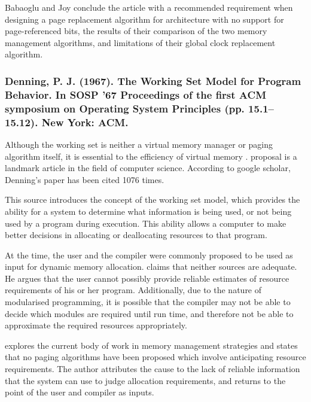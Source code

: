 Babaoglu and Joy conclude the article with a recommended requirement when designing a page replacement algorithm for architecture with no support for page-referenced bits, the results of their comparison of the two memory management algorithms, and limitations of their global clock replacement algorithm.

\subsubsection*{Denning, P. J. (1967). The Working Set Model for Program Behavior. In SOSP ’67 Proceedings of the first ACM symposium on Operating System Principles (pp. 15.1–15.12). New York: ACM.}

Although the working set is neither a virtual memory manager or paging algorithm itself, it is essential to the efficiency of virtual memory \citep{Silberschatz2013}.  proposal is a landmark article in the field of computer science. According to google scholar, Denning's paper has been cited 1076 times.

This source introduces the concept of the working set model, which provides the ability for a system to determine what information is being used, or not being used by a program during execution. This ability allows a computer to make better decisions in allocating or deallocating resources to that program.

At the time, the user and the compiler were commonly proposed to be used as input for dynamic memory allocation. \citet[p. 15.1]{Denning1967} claims that neither sources are adequate. He argues that the user cannot possibly provide reliable estimates of resource requirements of his or her program. Additionally, due to the nature of modularised programming, it is possible that the compiler may not be able to decide which modules are required until run time, and therefore not be able to approximate the required resources appropriately.

\citet{Denning1967} explores the current body of work in memory management strategies and states that no paging algorithms have been proposed which involve anticipating resource requirements. The author attributes the cause to the lack of reliable information that the system can use to judge allocation requirements, and returns to the point of the user and compiler as inputs.

